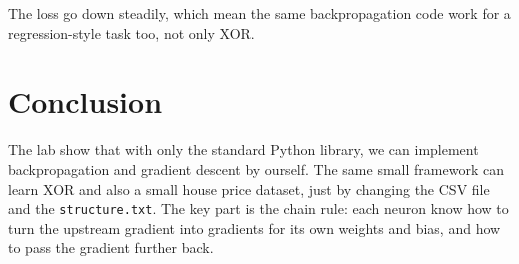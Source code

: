 \documentclass[12pt,a4paper]{article}
\begin{document}
The loss go down steadily, which mean the same backpropagation code work for a regression-style task too, not only XOR.

\section{Conclusion}

The lab show that with only the standard Python library, we can implement backpropagation and gradient descent by ourself. The same small framework can learn XOR and also a small house price dataset, just by changing the CSV file and the \texttt{structure.txt}. The key part is the chain rule: each neuron know how to turn the upstream gradient into gradients for its own weights and bias, and how to pass the gradient further back.
\end{document}
